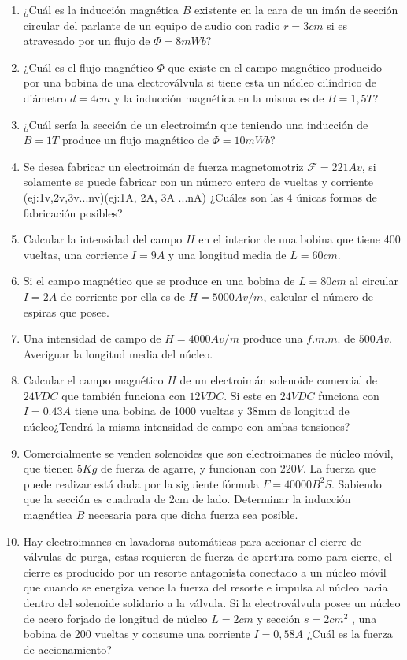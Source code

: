 \documentclass[a4paper]{article}
\begin{document}
\begin{enumerate}
\large
    \item ¿Cuál es la inducción magnética $B$ existente en la cara de un imán de sección circular del parlante de un equipo de audio con radio $r=3cm$ si es atravesado por un flujo de $\Phi = 8mWb$?
    \item ¿Cuál es el flujo magnético $\Phi$ que existe en el campo magnético producido por una bobina de una electroválvula si tiene esta un núcleo cilíndrico de diámetro $d=4cm$ y la inducción magnética en la misma es de $B=1,5T$?
    \item ¿Cuál sería la sección de un electroimán que teniendo una inducción de $B=1T$ produce un flujo magnético de $\Phi=10mWb$?
    \item Se desea fabricar un electroimán de fuerza magnetomotriz $\mathcal{F}=221Av$, si solamente se puede fabricar con un número entero de vueltas y corriente (ej:1v,2v,3v...nv)(ej:1A, 2A, 3A ...nA) ¿Cuáles son las $4$ únicas formas de fabricación posibles?
    \item Calcular la intensidad del campo $H$ en el interior de una bobina que tiene 400 vueltas, una corriente $I=9A$ y una longitud media de $L=60cm$.
    \item Si el campo magnético que se produce en una bobina de $L=80cm$ al circular $I=2A$ de corriente por ella es de $H=5000Av/m$, calcular el número de espiras que posee.
    \item Una intensidad de campo de $H=4000Av/m$ produce una $f.m.m.$ de $500Av$. Averiguar la longitud media del núcleo.
    \item Calcular el campo magnético $H$ de un electroimán solenoide comercial de $24VDC$ que también funciona con $12VDC$. Si este en $24VDC$ funciona con $I=0.43A$ tiene una bobina de 1000 vueltas y 38mm de longitud de núcleo¿Tendrá la misma intensidad de campo con ambas tensiones?
    \item Comercialmente se venden solenoides que son electroimanes de núcleo móvil, que tienen $5Kg$ de fuerza de agarre, y funcionan con $220V$. La fuerza que puede realizar está dada por la siguiente fórmula $ F = 40000 B^2 S$. Sabiendo que la sección es cuadrada de 2cm de lado. Determinar la inducción magnética $B$ necesaria para que dicha fuerza sea posible.
    \item Hay electroimanes en lavadoras automáticas para accionar el cierre de válvulas de purga, estas requieren de fuerza de apertura como para cierre, el cierre es producido por un resorte antagonista conectado a un núcleo móvil que cuando se energiza vence la fuerza del resorte e impulsa al núcleo hacia dentro del solenoide solidario a la válvula. Si la electroválvula posee un núcleo de acero forjado de longitud de núcleo $L=2cm$ y sección $s=2cm^2$ , una bobina de 200 vueltas y consume una corriente $I=0,58A$ ¿Cuál es la fuerza de accionamiento?

\end{enumerate}
\end{document}
